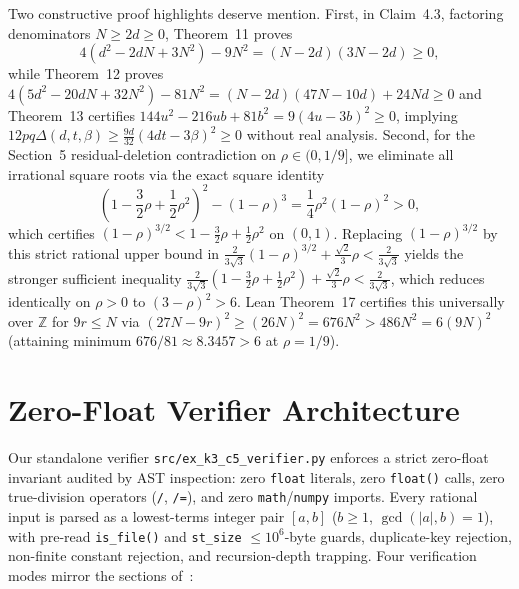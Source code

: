 \documentclass[10pt,twocolumn]{article}
\begin{document}
Two constructive proof highlights deserve mention. First, in Claim~4.3, factoring denominators $N\ge 2d \ge 0$, Theorem~11 proves
\begin{equation}
\label{eq:claim43_a}
4(d^2 - 2dN + 3N^2) - 9 N^2 = (N - 2d)(3N - 2d) \ge 0,
\end{equation}
while Theorem~12 proves $4(5d^2 - 20dN + 32N^2) - 81 N^2 = (N - 2d)(47N - 10d) + 24Nd \ge 0$ and Theorem~13 certifies $144u^2 - 216ub + 81b^2 = 9(4u - 3b)^2 \ge 0$, implying $12pq\Delta(d,t,\beta) \ge \tfrac{9d}{32}(4dt - 3\beta)^2 \ge 0$ without real analysis. Second, for the Section~5 residual-deletion contradiction on $\rho \in (0, 1/9]$, we eliminate all irrational square roots via the exact square identity
\begin{equation}
\label{eq:rho_sq}
\left(1 - \frac{3}{2}\rho + \frac{1}{2}\rho^2\right)^2 - (1-\rho)^3 = \frac{1}{4}\rho^2(1-\rho)^2 > 0,
\end{equation}
which certifies $(1-\rho)^{3/2} < 1 - \tfrac{3}{2}\rho + \tfrac{1}{2}\rho^2$ on $(0,1)$. Replacing $(1-\rho)^{3/2}$ by this strict rational upper bound in $\tfrac{2}{3\sqrt{3}}(1-\rho)^{3/2} + \tfrac{\sqrt{2}}{3}\rho < \tfrac{2}{3\sqrt{3}}$ yields the stronger sufficient inequality $\tfrac{2}{3\sqrt{3}}(1 - \tfrac{3}{2}\rho + \tfrac{1}{2}\rho^2) + \tfrac{\sqrt{2}}{3}\rho < \tfrac{2}{3\sqrt{3}}$, which reduces identically on $\rho > 0$ to $(3-\rho)^2 > 6$. Lean Theorem~17 certifies this universally over $\mathbb{Z}$ for $9r \le N$ via $(27N - 9r)^2 \ge (26N)^2 = 676N^2 > 486N^2 = 6(9N)^2$ (attaining minimum $676/81 \approx 8.3457 > 6$ at $\rho = 1/9$).

\section{Zero-Float Verifier Architecture}
Our standalone verifier \nolinkurl{src/ex_k3_c5_verifier.py} enforces a strict zero-float invariant audited by AST inspection: zero \texttt{float} literals, zero \texttt{float()} calls, zero true-division operators (\texttt{/}, \texttt{/=}), and zero \texttt{math}/\texttt{numpy} imports. Every rational input is parsed as a lowest-terms integer pair $[a, b]$ ($b \ge 1$, $\gcd(|a|, b) = 1$), with pre-read \texttt{is\_file()} and \texttt{st\_size} $\le 10^6$-byte guards, duplicate-key rejection, non-finite constant rejection, and recursion-depth trapping. Four verification modes mirror the sections of~\cite{CuiGyoriZhangZhu2026}:
\end{document}
